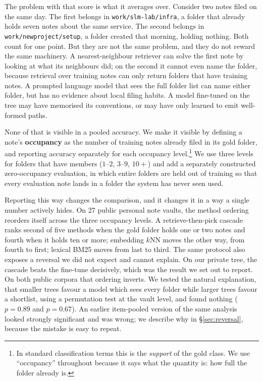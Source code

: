 \documentclass[11pt]{article}
\begin{document}
The problem with that score is what it averages over.
Consider two notes filed on the same day.
The first belongs in \texttt{work/slm-lab/infra}, a folder that already holds seven notes about the same service.
The second belongs in \texttt{work/newproject/setup}, a folder created that morning, holding nothing.
Both count for one point.
But they are not the same problem, and they do not reward the same machinery.
A nearest-neighbour retriever can solve the first note by looking at what its neighbours did; on the second it cannot even name the folder, because retrieval over training notes can only return folders that have training notes.
A prompted language model that sees the full folder list can name either folder, but has no evidence about local filing habits.
A model fine-tuned on the tree may have memorised its conventions, or may have only learned to emit well-formed paths.

None of that is visible in a pooled accuracy.
We make it visible by defining a note's \textbf{occupancy} as the number of training notes already filed in its gold folder, and reporting accuracy separately for each occupancy level.\footnote{In standard classification terms this is the \emph{support} of the gold class. We use ``occupancy'' throughout because it says what the quantity is: how full the folder already is.}
We use three levels for folders that have members ($1$--$2$, $3$--$9$, $10{+}$) and add a separately constructed zero-occupancy evaluation, in which entire folders are held out of training so that every evaluation note lands in a folder the system has never seen used.

Reporting this way changes the comparison, and it changes it in a way a single number actively hides.
On 27 public personal note vaults, the method ordering reorders itself across the three occupancy levels.
A retrieve-then-pick cascade ranks second of five methods when the gold folder holds one or two notes and fourth when it holds ten or more; embedding $k$NN moves the other way, from fourth to first; lexical BM25 moves from last to third.
The same protocol also exposes a reversal we did not expect and cannot explain.
On our private tree, the cascade beats the fine-tune decisively, which was the result we set out to report.
On both public corpora that ordering inverts.
We tested the natural explanation, that smaller trees favour a model which sees every folder while larger trees favour a shortlist, using a permutation test at the vault level, and found nothing ($p{=}0.89$ and $p{=}0.67$).
An earlier item-pooled version of the same analysis looked strongly significant and was wrong; we describe why in \S\ref{sec:reversal}, because the mistake is easy to repeat.
\end{document}
